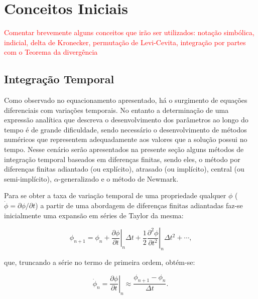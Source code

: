 \section{Conceitos Iniciais} \label{CI}

\textcolor{red}{Comentar brevemente alguns conceitos que irão ser utilizados: notação simbólica, indicial, delta de Kronecker, permutação de Levi-Cevita, integração por partes com o Teorema da divergência}

\subsection{Integração Temporal} \label{MEFP-IntTemp}

Como observado no equacionamento apresentado, há o surgimento de equações diferenciais com variações temporais. No entanto a determinação de uma expressão analítica que descreva o desenvolvimento dos parâmetros ao longo do tempo é de grande dificuldade, sendo necessário o desenvolvimento de métodos numéricos que representem adequadamente aos valores que a solução possui no tempo. Nesse cenário serão apresentados na presente seção alguns métodos de integração temporal baseados em diferenças finitas, sendo eles, o método por diferenças finitas adiantado (ou explícito), atrasado (ou implícito), central (ou semi-implícito), $\alpha$-generalizado e o método de Newmark.

Para se obter a taxa de variação temporal de uma propriedade qualquer $\phi$ ($\dot{\phi}=\partial\phi/\partial t$) a partir de uma abordagem de diferenças finitas adiantadas faz-se inicialmente uma expansão em séries de Taylor da mesma:

\begin{equation}
    \phi_{n+1}=\phi_n+\left.\frac{\partial\phi}{\partial t}\right|_n\Delta t+\frac{1}{2}\left.\frac{\partial^2\phi}{\partial t^2}\right|_n\Delta t^2+\cdots\text{,}\label{eq:TaylorAd}
\end{equation}

\noindent que, truncando a série no termo de primeira ordem, obtém-se:

\begin{equation}
    \dot{\phi}_n=\left.\frac{\partial\phi}{\partial t}\right|_n\approx\frac{\phi_{n+1}-\phi_n}{\Delta t}\text{.}
\end{equation}

